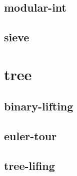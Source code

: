 \documentclass[a4paper, twocolumn]{article}
\begin{document}
\subsection{modular-int}

\subsection{sieve}

\section{tree}
\subsection{binary-lifting}

\subsection{euler-tour}

\subsection{tree-lifing}

\end{document}

